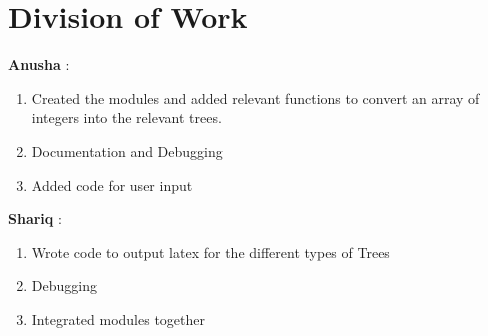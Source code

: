 \documentclass{article}
\begin{document}
\section{Division of Work}
\textbf{Anusha } :
\begin{enumerate}
    \item Created the modules and added relevant functions to convert an array of integers into the relevant trees. 
    \item Documentation and Debugging
    \item Added code for user input
\end{enumerate}
\textbf{Shariq} :
\begin{enumerate}
    \item Wrote code to output latex for the different types of Trees
    \item Debugging
    \item Integrated modules together
\end{enumerate}
\end{document}

